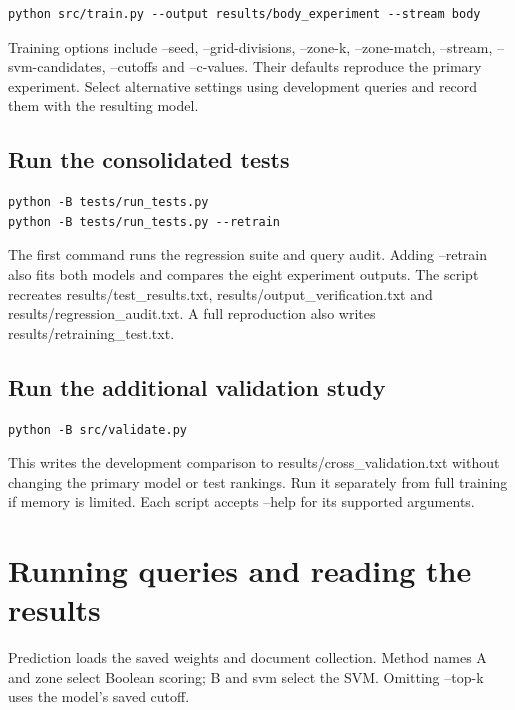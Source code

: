 \documentclass[12pt,a4paper]{article}
\begin{document}
\begin{small}\begin{verbatim}
python src/train.py --output results/body_experiment --stream body
\end{verbatim}\end{small}
Training options include --seed, --grid-divisions, --zone-k, --zone-match, --stream, --svm-candidates, --cutoffs and --c-values. Their defaults reproduce the primary experiment. Select alternative settings using development queries and record them with the resulting model.

\subsection{Run the consolidated tests}
\begin{small}\begin{verbatim}
python -B tests/run_tests.py
python -B tests/run_tests.py --retrain
\end{verbatim}\end{small}
The first command runs the regression suite and query audit. Adding --retrain also fits both models and compares the eight experiment outputs. The script recreates results/test\_results.txt, results/output\_verification.txt and results/regression\_audit.txt. A full reproduction also writes results/retraining\_test.txt.

\subsection{Run the additional validation study}
\begin{small}\begin{verbatim}
python -B src/validate.py
\end{verbatim}\end{small}
This writes the development comparison to results/cross\_validation.txt without changing the primary model or test rankings. Run it separately from full training if memory is limited. Each script accepts --help for its supported arguments.

\section{Running queries and reading the results}
Prediction loads the saved weights and document collection. Method names A and zone select Boolean scoring; B and svm select the SVM. Omitting --top-k uses the model's saved cutoff.
\end{document}
